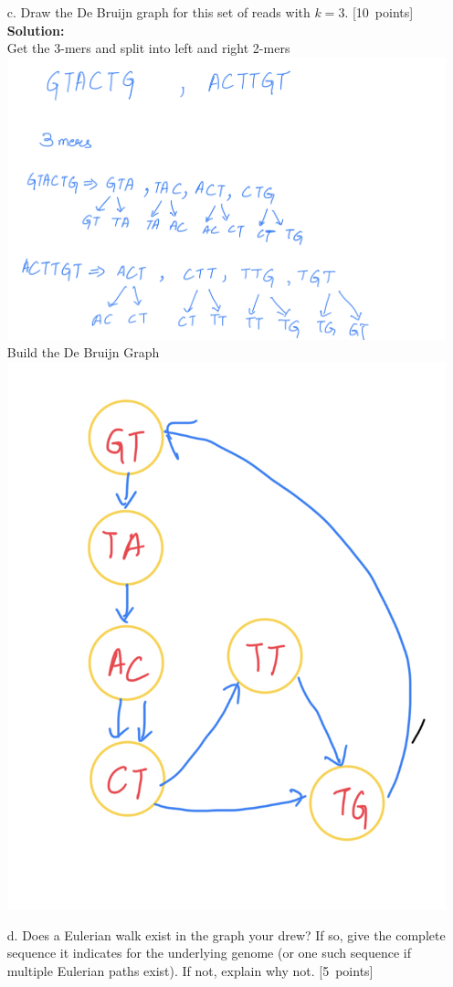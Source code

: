 \begin{enumerate}
\begin{enumerate}
\begin{enumerate}
{{\vspace{10cm}
}}
\newpage
\item[c.]  Draw the De Bruijn graph for this set of reads with $k=3$. [10~points]
\vspace{1cm}
\textbf{Solution:}\\
Get the 3-mers and split into left and right 2-mers\\
\includegraphics[scale=0.23]{2c1.jpeg}
\newline
Build the De Bruijn Graph \\
\includegraphics[scale=0.2]{2c2.jpeg}
\newpage
\item[d.] Does a Eulerian walk exist in the graph your drew?  If so, give the complete sequence it indicates for the underlying genome (or one such sequence if multiple Eulerian paths exist).  If not, explain why not. [5~points]


\end{enumerate}
\end{enumerate}
\end{enumerate}
